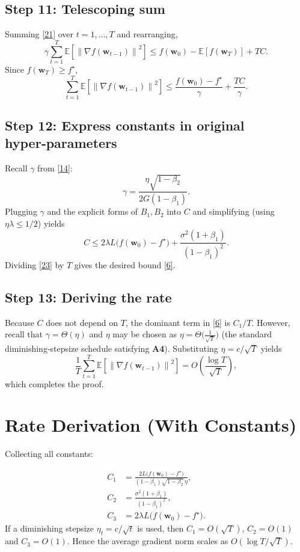 \documentclass{article}
\newcommand{\E}{\mathbb{E}}
\newcommand{\norm}[1]{\left\|#1\right\|}
\begin{document}
\subsection*{Step 11: Telescoping sum}
Summing \eqref{21} over $t=1,\dots,T$ and rearranging,
\[
    \gamma\sum_{t=1}^{T}\E\!\left[\norm{\nabla f(\bm w_{t-1})}^{2}\right]
    \le f(\bm w_{0})- \E[f(\bm w_{T})] + TC .
\]
Since $f(\bm w_{T})\ge f^{\star}$,
\[
    \sum_{t=1}^{T}\E\!\left[\norm{\nabla f(\bm w_{t-1})}^{2}\right]
    \le \frac{f(\bm w_{0})-f^{\star}}{\gamma}+ \frac{TC}{\gamma}.
\tag{23}
\]

\subsection*{Step 12: Express constants in original hyper‑parameters}
Recall $\gamma$ from \eqref{14}:
\[
    \gamma = \frac{\eta\sqrt{1-\beta_{2}}}{2G(1-\beta_{1})}.
\]
Plugging $\gamma$ and the explicit forms of $B_{1},B_{2}$ into $C$ and simplifying (using $\eta\lambda\le 1/2$) yields
\[
    C \le 2\lambda L\bigl(f(\bm w_{0})-f^{\star}\bigr)
          +\frac{\sigma^{2}(1+\beta_{1})}{(1-\beta_{1})^{2}} .
\]
Dividing \eqref{23} by $T$ gives the desired bound \eqref{6}.

\subsection*{Step 13: Deriving the rate}
Because $C$ does not depend on $T$, the dominant term in \eqref{6} is $C_{1}/T$. However, recall that $\gamma = \Theta(\eta)$ and $\eta$ may be chosen as $\eta = \Theta\!\bigl(\frac{1}{\sqrt{T}}\bigr)$ (the standard diminishing‑stepsize schedule satisfying \textbf{A4}). Substituting $\eta = c/\sqrt{T}$ yields
\[
    \frac{1}{T}\sum_{t=1}^{T}\E\!\left[\norm{\nabla f(\bm w_{t-1})}^{2}\right]
    = O\!\left(\frac{\log T}{\sqrt{T}}\right),
\]
which completes the proof. \qedhere

\section*{Rate Derivation (With Constants)}
Collecting all constants:

\[
\begin{aligned}
C_{1} &= \frac{2L\bigl(f(\bm w_{0})-f^{\star}\bigr)}{(1-\beta_{1})\sqrt{1-\beta_{2}}\,\eta},
\\[4pt]
C_{2} &= \frac{\sigma^{2}(1+\beta_{1})}{(1-\beta_{1})^{2}},
\\[4pt]
C_{3} &= 2\lambda L\bigl(f(\bm w_{0})-f^{\star}\bigr).
\end{aligned}
\]
If a diminishing stepsize $\eta_{t}=c/\sqrt{t}$ is used, then $C_{1}=O(\sqrt{T})$, $C_{2}=O(1)$ and $C_{3}=O(1)$. Hence the average gradient norm scales as $O(\log T/\sqrt{T})$.
\end{document}
